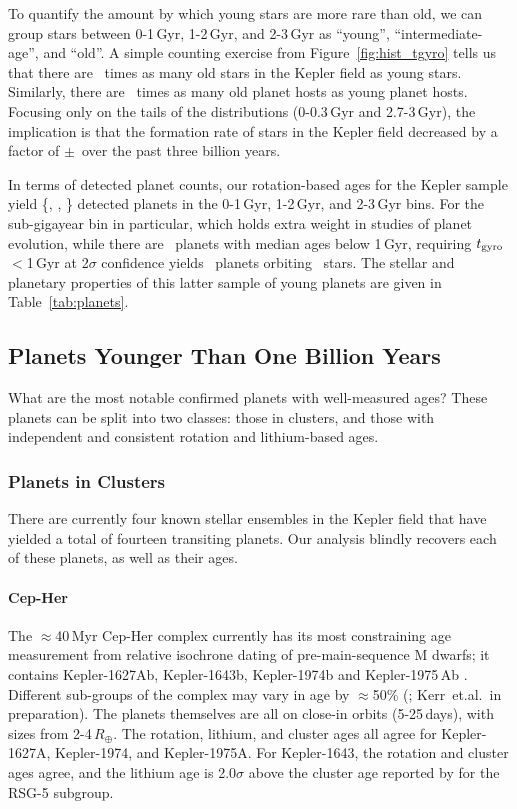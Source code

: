 \documentclass[11pt,twocolumn,tighten]{aastex63}
\begin{document}
To quantify the amount by which young stars are more rare than old, we
can group stars between 0-1\,Gyr, 1-2\,Gyr, and 2-3\,Gyr as ``young'',
``intermediate-age'', and ``old''.  A simple counting exercise from
Figure~\ref{fig:hist_tgyro} tells us that there are \ratioobtoybstars\
times as many old stars in the Kepler field as young stars.
Similarly, there are \ratioobtoybplanets\ times as many old planet
hosts as young planet hosts.  Focusing only on the tails of the
distributions (0-0.3\,Gyr and 2.7-3\,Gyr), the implication is that the
formation rate of stars in the Kepler field decreased by a factor of
\ratiosfr$\pm$\uncratiosfr\ over the past three billion years.

In terms of detected planet counts, our rotation-based ages for the
Kepler sample yield \{\nplyounggyro, \nplmidgyro, \nploldgyro\}
detected planets in the 0-1\,Gyr, 1-2\,Gyr, and 2-3\,Gyr bins.  For
the sub-gigayear bin in particular, which holds extra weight in
studies of planet evolution, while there are \nplyounggyro\ planets
with median ages below 1\,Gyr, requiring $t_{\rm gyro}$$<$1\,Gyr at
2$\sigma$ confidence yields \nplyounggyrotwosigma\ planets orbiting
\nplhostsyounggyrotwosigma\ stars.  The stellar and planetary
properties of this latter sample of young planets are given in
Table~\ref{tab:planets}.


\subsection{Planets Younger Than One Billion Years}

What are the most notable confirmed planets with well-measured ages?
These planets can be split into two classes:
those in clusters, and those with independent and consistent
rotation and lithium-based ages.

\subsubsection{Planets in Clusters}
\label{subsec:clusterplanets}

There are currently four known stellar ensembles in the Kepler field that have
yielded a total of fourteen transiting planets.
Our analysis blindly recovers each of these planets, as well as their ages.

\paragraph{Cep-Her}
The $\approx$40\,Myr Cep-Her complex currently has its most
constraining age measurement from relative isochrone dating of
pre-main-sequence M dwarfs; it contains Kepler-1627Ab,
Kepler-1643b, Kepler-1974b and Kepler-1975\,Ab
\citep{Bouma_2022a,Bouma_2022b}.  Different sub-groups of the complex
may vary in age by $\approx$50\% (\citealt{Bouma_2022b};
Kerr~et.al.~in preparation).  The planets themselves are all on
close-in orbits (5-25\,days), with sizes from 2-4\,$R_\oplus$.  The
rotation, lithium, and cluster ages all agree for
Kepler-1627A, Kepler-1974, and Kepler-1975A.  For Kepler-1643, the
rotation and cluster ages agree, and the lithium age is 2.0$\sigma$
above the cluster age reported by \citet{Bouma_2022b} for the RSG-5 subgroup.
\end{document}
